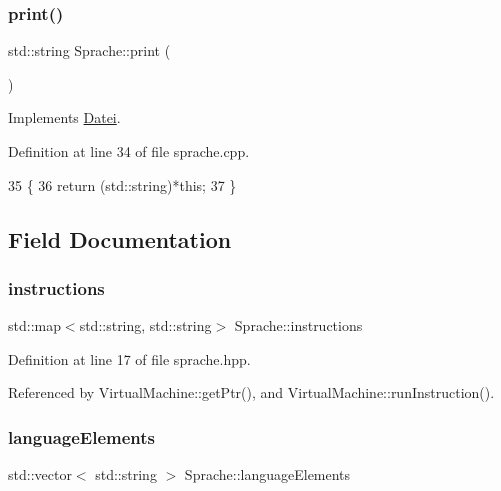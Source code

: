 \subsubsection{\texorpdfstring{print()}{print()}}
{\footnotesize\ttfamily std\+::string Sprache\+::print (\begin{DoxyParamCaption}{ }\end{DoxyParamCaption})\hspace{0.3cm}{\ttfamily [virtual]}}



Implements \mbox{\hyperlink{class_datei_a5dedc9776ebe637f0842300f648d4b17}{Datei}}.



Definition at line 34 of file sprache.\+cpp.


\begin{DoxyCode}
35 \{
36     \textcolor{keywordflow}{return} (std::string)*\textcolor{keyword}{this};
37 \}
\end{DoxyCode}


\subsection{Field Documentation}
\mbox{\label{class_sprache_a6052a9ec0d1202da4b8ff6e6a52e6244}} 
\subsubsection{\texorpdfstring{instructions}{instructions}}
{\footnotesize\ttfamily std\+::map$<$std\+::string, std\+::string$>$ Sprache\+::instructions}



Definition at line 17 of file sprache.\+hpp.



Referenced by Virtual\+Machine\+::get\+Ptr(), and Virtual\+Machine\+::run\+Instruction().

\mbox{\label{class_sprache_ac0e8018bac279c35c325ad162cb0ba17}} 
\subsubsection{\texorpdfstring{language\+Elements}{languageElements}}
{\footnotesize\ttfamily std\+::vector$<$ std\+::string $>$ Sprache\+::language\+Elements\hspace{0.3cm}{\ttfamily [static]}}

